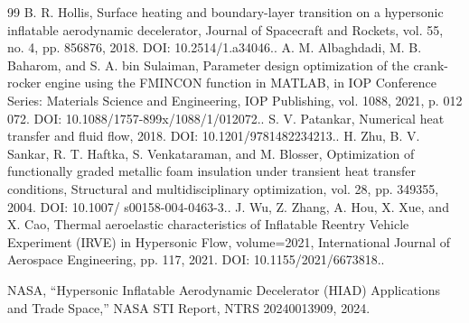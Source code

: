 \documentclass[conference]{IEEEtran}
\begin{document}
\begin{sloppypar}
\begin{thebibliography}{99}
 B. R. Hollis, Surface heating and boundary-layer transition on a hypersonic inflatable aerodynamic decelerator, Journal of Spacecraft and Rockets, vol. 55, no. 4, pp. 856876, 2018. DOI: 10.2514/1.a34046..
 A. M. Albaghdadi, M. B. Baharom, and S. A. bin Sulaiman, Parameter design optimization of the crank-rocker engine using the FMINCON function in MATLAB, in IOP Conference Series: Materials Science and Engineering, IOP Publishing, vol. 1088, 2021, p. 012 072. DOI: 10.1088/1757-899x/1088/1/012072..
 S. V. Patankar, Numerical heat transfer and fluid flow, 2018. DOI: 10.1201/9781482234213..
 H. Zhu, B. V. Sankar, R. T. Haftka, S. Venkataraman, and M. Blosser, Optimization of functionally graded metallic foam insulation under transient heat transfer conditions, Structural and multidisciplinary optimization, vol. 28, pp. 349355, 2004. DOI: 10.1007/ s00158-004-0463-3..
 J. Wu, Z. Zhang, A. Hou, X. Xue, and X. Cao, Thermal aeroelastic characteristics of Inflatable Reentry Vehicle Experiment (IRVE) in Hypersonic Flow, volume=2021, International Journal of Aerospace Engineering, pp. 117, 2021. DOI: 10.1155/2021/6673818..

 NASA, ``Hypersonic Inflatable Aerodynamic Decelerator (HIAD) Applications and Trade Space,'' NASA STI Report, NTRS 20240013909, 2024.
\end{thebibliography}
\end{sloppypar}
\end{document}
